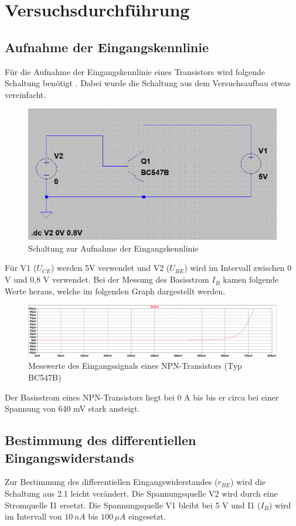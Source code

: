 \chapter{Versuchsdurchführung}
    \section{Aufnahme der Eingangskennlinie}
        Für die Aufnahme der Eingangskennlinie  eines Transistors wird folgende Schaltung benötigt . 
        Dabei wurde die Schaltung aus dem Versuchsaufbau etwas vereinfacht.

        \begin{figure}[!ht]
            \centering
            \includegraphics[width=0.5\linewidth]{Bilder/21aufbau.PNG}
            \caption{Schaltung zur Aufnahme der Eingangskennlinie}
            \label{fig:21}
        \end{figure}

        Für V1 (\(U_{CE}\)) werden 5V verwendet und V2 (\(U_{BE}\)) wird im Intervall zwischen 0 V und 0,8 V verwendet. Bei der Messung des Basisstrom \(I_B\) kamen folgende Werte heraus, welche im folgenden Graph dargestellt werden.

        \begin{figure}[!ht]
            \centering
                \includegraphics[width=\linewidth]{Bilder/21graph.PNG}
            \caption{Messwerte des Eingangssignals eines NPN-Transistors (Typ BC547B)}
        \end{figure}

        Der Basisstrom eines NPN-Transistors liegt bei 0 A bis bis er circa bei einer Spannung von 640 mV stark ansteigt.

        \newpage
    \section{Bestimmung des differentiellen Eingangswiderstands}
        Zur Bestimmung des differentiellen Eingangswiderstandes (\(r_{BE}\)) wird die Schaltung aus 2.1 leicht verändert. Die Spannungsquelle V2 wird durch eine Stromquelle I1 ersetzt. Die Spannungsquelle V1 bleibt bei 5 V und I1 (\(I_B\)) wird im Intervall von \(10\,nA\) bis \(100\,\mu A\) eingesetzt. 

